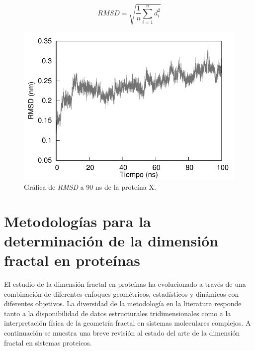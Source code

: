 	\begin{figure}[H]
	\hspace{-0.3cm} 
	\begin{minipage}{0.49\textwidth}
		\centering
		\begin{equation}
			RMSD = \sqrt{\frac{1}{n} \sum_{i=1}^{n} d_i^2}
			\label{rmsd}
		\end{equation}
	\end{minipage}
	\hspace{0.2cm}
	\begin{minipage}{0.49\textwidth}
		\centering
		\includegraphics[width=\linewidth]{graphs/rmsd.pdf}
	\end{minipage}
	\caption{Gráfica de \textit{RMSD} a 90 ns de la proteína X.}
	\label{rmsd-graf}
	\end{figure}


\color{blue}

\section{Metodologías para la determinación de la dimensión fractal en proteínas}

El estudio de la dimensión fractal en proteínas ha evolucionado a través de una combinación de diferentes enfoques geométricos, estadísticos y dinámicos con diferentes objetivos. La diversidad de la metodología en la literatura responde tanto a la disponibilidad de datos estructurales tridimensionales como a la interpretación física de la geometría fractal en sistemas moleculares complejos. A continuación se muestra una breve revisión al estado del arte de la dimensión fractal en sistemas proteicos.

